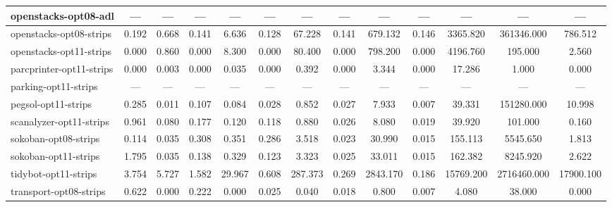 \documentclass[a4paper,12pt]{article}
\begin{document}
\begin{table}[]
\begin{tabular}{l@{\hspace{6pt}} *{12}{c}}
openstacks-opt08-adl     & ---        & ---       & ---        & ---        & ---        & ---         & ---        & ---          & ---        & ---          & ---           & ---       \\ \hline
openstacks-opt08-strips  & 0.192      & 0.668     & 0.141      & 6.636      & 0.128      & 67.228      & 0.141      & 679.132      & 0.146      & 3365.820     & 361346.000    & 786.512   \\ \hline
openstacks-opt11-strips  & 0.000      & 0.860     & 0.000      & 8.300      & 0.000      & 80.400      & 0.000      & 798.200      & 0.000      & 4196.760     & 195.000       & 2.560     \\ \hline
parcprinter-opt11-strips & 0.000      & 0.003     & 0.000      & 0.035      & 0.000      & 0.392       & 0.000      & 3.344        & 0.000      & 17.286       & 1.000         & 0.000     \\ \hline
parking-opt11-strips     & ---        & ---       & ---        & ---        & ---        & ---         & ---        & ---          & ---        & ---          & ---           & ---       \\ \hline
pegsol-opt11-strips      & 0.285      & 0.011     & 0.107      & 0.084      & 0.028      & 0.852       & 0.027      & 7.933        & 0.007      & 39.331       & 151280.000    & 10.998    \\ \hline
scanalyzer-opt11-strips  & 0.961      & 0.080     & 0.177      & 0.120      & 0.118      & 0.880       & 0.026      & 8.080        & 0.019      & 39.920       & 101.000       & 0.160     \\ \hline
sokoban-opt08-strips     & 0.114      & 0.035     & 0.308      & 0.351      & 0.286      & 3.518       & 0.023      & 30.990       & 0.015      & 155.113      & 5545.650      & 1.813     \\ \hline
sokoban-opt11-strips     & 1.795      & 0.035     & 0.138      & 0.329      & 0.123      & 3.323       & 0.025      & 33.011       & 0.015      & 162.382      & 8245.920      & 2.622     \\ \hline
tidybot-opt11-strips     & 3.754      & 5.727     & 1.582      & 29.967     & 0.608      & 287.373     & 0.269      & 2843.170     & 0.186      & 15769.200    & 2716460.000   & 17900.100 \\ \hline
transport-opt08-strips   & 0.622      & 0.000     & 0.222      & 0.000      & 0.025      & 0.040       & 0.018      & 0.800        & 0.007      & 4.080        & 38.000        & 0.000     \\ \hline

\end{tabular}
\end{table}
\end{document}
